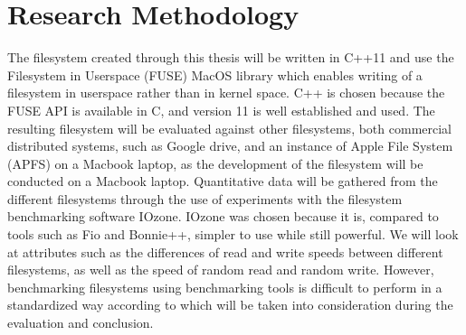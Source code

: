 
\section{Research Methodology}%

The filesystem created through this thesis will be written in C++11 and use the Filesystem in Userspace (FUSE) MacOS library\cite{HomeMacFUSE} which enables writing of a filesystem in userspace rather than in kernel space. C++ is chosen because the FUSE API is available in C, and version 11 is well established and used. The resulting filesystem will be evaluated against other filesystems, both commercial distributed systems, such as Google drive, and an instance of Apple File System (APFS)\cite{appleAppleFileSystem} on a Macbook laptop, as the development of the filesystem will be conducted on a Macbook laptop. Quantitative data will be gathered from the different filesystems through the use of experiments with the filesystem benchmarking software IOzone\cite{IozoneFilesystemBenchmark}. IOzone was chosen because it is, compared to tools such as Fio and Bonnie++, simpler to use while still powerful\cite{agarwalComparingIOBenchmarks2018}. We will look at attributes such as the differences of read and write speeds between different filesystems, as well as the speed of random read and random write. However, benchmarking filesystems using benchmarking tools is difficult to perform in a standardized way according to \citeauthor{tarasovBenchmarkingFileSystem2011}\cite{tarasovBenchmarkingFileSystem2011} which will be taken into consideration during the evaluation and conclusion.